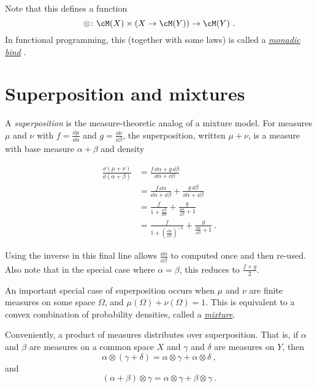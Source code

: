 \documentclass{juliacon}
\begin{document}
Note that this defines a function
\[
\otimes \colon \cM(X) \times (X \to \cM(Y)) \to \cM(Y)\ .
\]
In functional programming, this (together with some laws) is called a \href{https://en.wikipedia.org/wiki/Monad_(functional_programming)}{\emph{monadic bind}} \cite{ramsey2002stochastic}. 

\section{Superposition and mixtures \label{superposition}}

A \emph{superposition} is the measure-theoretic analog of a mixture model. For measures $\mu$ and $\nu$ with $f=\frac{\dd\mu}{\dd\alpha}$ and $g=\frac{\dd\nu}{\dd\beta}$, the superposition, written $\mu + \nu$, is a measure with base measure $\alpha + \beta$ and density

\[
\begin{aligned}\frac{\dd(\mu+\nu)}{\dd(\alpha+\beta)} & =\frac{f\,\dd\alpha+g\,\dd\beta}{\dd\alpha+\dd\beta}\\
 & =\frac{f\,\dd\alpha}{\dd\alpha+\dd\beta}+\frac{g\,\dd\beta}{\dd\alpha+\dd\beta}\\
 & =\frac{f}{1+\frac{\dd\beta}{\dd\alpha}}+\frac{g}{\frac{\dd\alpha}{\dd\beta}+1}\\
 & =\frac{f}{1+\left(\frac{\dd\alpha}{\dd\beta}\right)^{-1}}+\frac{g}{\frac{\dd\alpha}{\dd\beta}+1}\ .
\end{aligned}
\]

Using the inverse in this final line allows $\frac{\dd\alpha}{\dd\beta}$ to computed once and then re-used. Also note that in the special case where $\alpha=\beta$, this reduces to $\frac{f+g}{2}$.

An important special case of superposition occurs when $\mu$ and $\nu$ are finite measures on some space $\Omega$, and $\mu(\Omega) + \nu(\Omega) = 1$. This is equivalent to a convex combination of probability densities, called a \href{https://en.wikipedia.org/wiki/Mixture_distribution}{\emph{mixture}}.

Conveniently, a product of measures distributes over superposition. That is, if $\alpha$ and $\beta$ are measures on a common space $X$ and $\gamma$ and $\delta$ are measures on $Y$, then
\[
\alpha \otimes (\gamma + \delta) = \alpha \otimes \gamma + \alpha \otimes \delta\ ,
\]
and
\[
(\alpha + \beta) \otimes \gamma = \alpha \otimes \gamma + \beta \otimes \gamma\ .
\]
\end{document}

